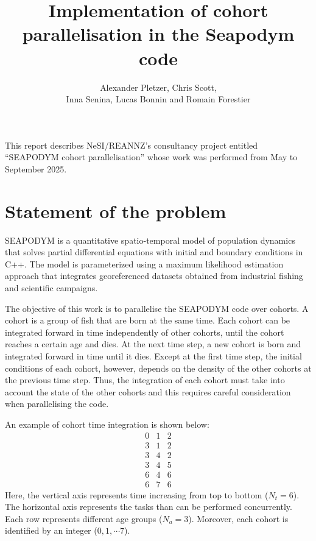 \documentclass[a4paper,oneside,12pt]{article}
\begin{document}
\author{Alexander Pletzer, Chris Scott, \\
Inna Senina, Lucas Bonnin and Romain Forestier}
\title{Implementation of cohort parallelisation in the Seapodym code}

\maketitle


\pagestyle{plain}

This report describes NeSI/REANNZ's consultancy project entitled ``SEAPODYM cohort parallelisation'' whose work was performed from May to September 2025.

\section{Statement of the problem}

SEAPODYM is a quantitative spatio-temporal model
of population dynamics that solves partial differential
equations with initial and boundary conditions in C++. 
The model is parameterized using a maximum
likelihood estimation approach that integrates georeferenced 
datasets obtained from industrial fishing and scientific campaigns.

The objective of this work is to parallelise the SEAPODYM code over cohorts. 
A cohort is a group of fish that are born at the same time. Each cohort 
can be integrated forward in time independently of other cohorts, until the cohort reaches a certain age and dies. 
At the next time step, a new cohort is born and integrated forward in time until it dies. Except 
at the first time step, the initial conditions of each cohort, however, depends on 
the density of the other cohorts at the previous time step. Thus, the integration of 
each cohort must take into account the state of the other cohorts and this requires 
careful consideration when parallelising the code.

An example of cohort time integration is shown below:
\begin{equation} \label{eq:cohorts}
\begin{array}{ccc}
0 & 1 & 2 \\
3 & 1 & 2 \\
3 & 4 & 2 \\
3 & 4 & 5 \\
6 & 4 & 6 \\
6 & 7 & 6
\end{array}
\end{equation}
Here, the vertical axis represents time increasing from top to bottom ($N_t = 6$). The horizontal axis represents the 
tasks than can be performed concurrently. Each row represents different age groups ($N_a = 3$). 
Moreover, each cohort is identified by an integer ($0, 1, \cdots 7$). 
\end{document}
